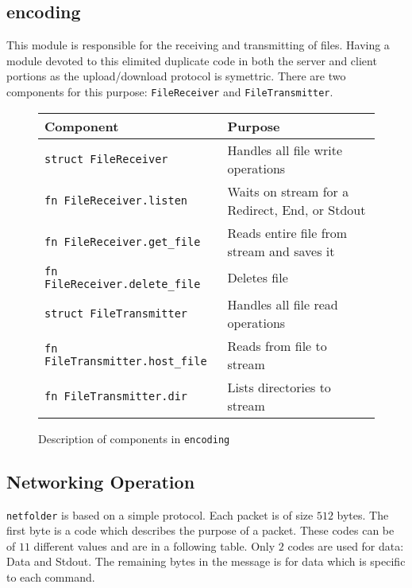 \documentclass{article}
\begin{document}
\subsection{encoding}
This module is responsible for the receiving and transmitting of files. Having a module devoted to this elimited duplicate code in both the server and client portions as the upload/download protocol is symettric. There are two components for this purpose: \verb|FileReceiver| and \verb|FileTransmitter|.
\begin{figure}
	\begin{tabular}{|l|l|}
		\hline
		Component & Purpose\\\hline
		\verb|struct FileReceiver| & Handles all file write operations\\
		\verb|fn FileReceiver.listen| & Waits on stream for a Redirect, End, or Stdout \\
		\verb|fn FileReceiver.get_file| & Reads entire file from stream and saves it \\
		\verb|fn FileReceiver.delete_file| & Deletes file\\
		\verb|struct FileTransmitter| & Handles all file read operations\\
		\verb|fn FileTransmitter.host_file| & Reads from file to stream\\
		\verb|fn FileTransmitter.dir| & Lists directories to stream\\
		\hline
	\end{tabular}
	\caption{Description of components in \texttt{encoding}}
\end{figure}

\subsection{Networking Operation}
\verb|netfolder| is based on a simple protocol. Each packet is of size $512$ bytes. The first byte is a code which describes the purpose of a packet. These codes can be of $11$ different values and are in a following table. Only $2$ codes are used for data: Data and Stdout. The remaining bytes in the message is for data which is specific to each command.\\
\end{document}
